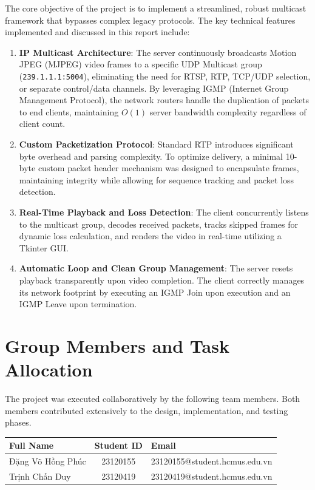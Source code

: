\documentclass[12pt,a4paper]{report}
\begin{document}
The core objective of the project is to implement a streamlined, robust multicast framework that bypasses complex legacy protocols. The key technical features implemented and discussed in this report include:
\begin{enumerate}
    \item \textbf{IP Multicast Architecture}: The server continuously broadcasts Motion JPEG (MJPEG) video frames to a specific UDP Multicast group (\texttt{239.1.1.1:5004}), eliminating the need for RTSP, RTP, TCP/UDP selection, or separate control/data channels. By leveraging IGMP (Internet Group Management Protocol), the network routers handle the duplication of packets to end clients, maintaining $O(1)$ server bandwidth complexity regardless of client count.
    \item \textbf{Custom Packetization Protocol}: Standard RTP introduces significant byte overhead and parsing complexity. To optimize delivery, a minimal 10-byte custom packet header mechanism was designed to encapsulate frames, maintaining integrity while allowing for sequence tracking and packet loss detection.
    \item \textbf{Real-Time Playback and Loss Detection}: The client concurrently listens to the multicast group, decodes received packets, tracks skipped frames for dynamic loss calculation, and renders the video in real-time utilizing a Tkinter GUI.
    \item \textbf{Automatic Loop and Clean Group Management}: The server resets playback transparently upon video completion. The client correctly manages its network footprint by executing an IGMP Join upon execution and an IGMP Leave upon termination.
\end{enumerate}

\section{Group Members and Task Allocation}
The project was executed collaboratively by the following team members. Both members contributed extensively to the design, implementation, and testing phases.

\begin{center}
\begin{tabularx}{\textwidth}{l c X}
\toprule
\textbf{Full Name} & \textbf{Student ID} & \textbf{Email} \\
\midrule
Đặng Võ Hồng Phúc & 23120155 & 23120155@student.hcmus.edu.vn \\
Trịnh Chấn Duy & 23120419 & 23120419@student.hcmus.edu.vn \\
\bottomrule
\end{tabularx}
\end{center}
\end{document}
